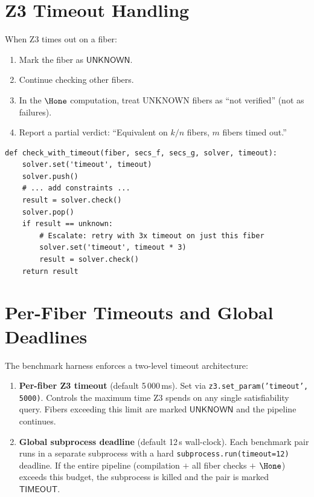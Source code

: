 \section{Z3 Timeout Handling}

When Z3 times out on a fiber:
\begin{enumerate}
  \item Mark the fiber as $\mathsf{UNKNOWN}$.
  \item Continue checking other fibers.
  \item In the $\Hone$ computation, treat UNKNOWN fibers as
    ``not verified'' (not as failures).
  \item Report a partial verdict: ``Equivalent on $k/n$ fibers,
    $m$ fibers timed out.''
\end{enumerate}

\begin{lstlisting}[caption={Timeout handling with escalation}]
def check_with_timeout(fiber, secs_f, secs_g, solver, timeout):
    solver.set('timeout', timeout)
    solver.push()
    # ... add constraints ...
    result = solver.check()
    solver.pop()
    if result == unknown:
        # Escalate: retry with 3x timeout on just this fiber
        solver.set('timeout', timeout * 3)
        result = solver.check()
    return result
\end{lstlisting}

\section{Per-Fiber Timeouts and Global Deadlines}

The benchmark harness enforces a two-level timeout architecture:

\begin{enumerate}
  \item \textbf{Per-fiber Z3 timeout} (default 5\,000\,ms).
    Set via \texttt{z3.set\_param('timeout', 5000)}.  Controls
    the maximum time Z3 spends on any single satisfiability query.
    Fibers exceeding this limit are marked $\mathsf{UNKNOWN}$ and
    the pipeline continues.

  \item \textbf{Global subprocess deadline} (default 12\,s wall-clock).
    Each benchmark pair runs in a separate subprocess with a hard
    \texttt{subprocess.run(timeout=12)} deadline.  If the entire
    pipeline (compilation $+$ all fiber checks $+$ $\Hone$) exceeds
    this budget, the subprocess is killed and the pair is marked
    $\mathsf{TIMEOUT}$.
\end{enumerate}

